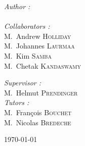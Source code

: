 \begin{titlepage}
\begin{center}
\begin{minipage}[t]{0.5\textwidth}
  \begin{flushleft} \large
    \emph{Author :}\\
    \reportauthor \\
	\vspace{0.5cm}
    \emph{Collaborators :}\\
    M.~Andrew \textsc{Holliday} \\
    M.~Johannes \textsc{Laurmaa} \\
    M.~Kim \textsc{Samba} \\
    M.~Chetak \textsc{Kandaswamy}
  \end{flushleft}
\end{minipage}
\begin{minipage}[t]{0.49\textwidth}
  \begin{flushright} \large
    \emph{Supervisor :} \\
    M.~Helmut \textsc{Prendinger} \\
	\vspace{0.5cm}
    \emph{Tutors :} \\
    M.~François \textsc{Bouchet} \\
    M.~Nicolas \textsc{Bredeche}
  \end{flushright}
\end{minipage}

\vfill

{\large \today}

\end{center}

\end{titlepage}
